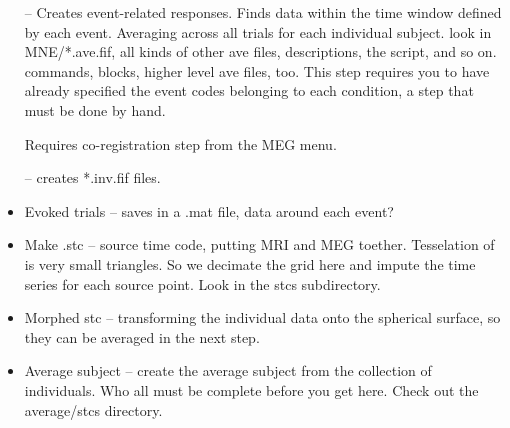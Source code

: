 \documentclass[11pt]{article}
\begin{document}
\begin{itemize}

 --
Creates event-related responses.  Finds data 
  within the time window defined by each event.  Averaging across all
  trials for each individual subject.  look in MNE/*.ave.fif, all kinds of other
  ave  files, descriptions, the script, and so on. commands, blocks, higher
  level ave files, too.  This step requires you to have already specified the
  event codes belonging to each condition, a step that must be done by hand.

  Requires
co-registration step from the MEG menu.

 -- creates *.inv.fif files.

\item Evoked trials -- saves in a .mat file, data around each event?

\item Make .stc -- source time code, putting MRI and MEG toether.
  Tesselation of \fs is very small triangles.  So we decimate
  the grid here and impute the time series for each source point.
  Look in the stcs subdirectory.

\item Morphed stc -- transforming the individual data onto the
  spherical surface, so they can be averaged in the next step.

\item Average subject -- create the average subject from the
  collection of individuals.  Who all must be complete before you get
  here. Check out the average/stcs directory.

\end{itemize}
\end{document}
